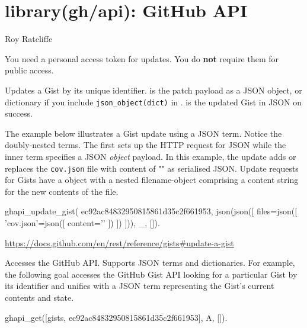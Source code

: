 \chapter{library(gh/api): GitHub API}\label{sec:api}

\begin{tags}
Roy Ratcliffe
\end{tags}

You need a personal access token for updates. You do \textbf{not} require
them for public access.\vspace{0.7cm}

\begin{description}
Updates a Gist by its unique identifier.  is the patch payload
as a JSON object, or dictionary if you include \verb$json_object(dict)$ in
.  is the updated Gist in JSON on success.

The example below illustrates a Gist update using a JSON term.
Notice the doubly-nested  terms. The first sets up the HTTP
request for JSON while the inner term specifies a JSON \textit{object}
payload. In this example, the update adds or replaces the \verb$cov.json$
file with content of "\Scurl{}" as serialised JSON. Update requests for
Gists have a  object with a nested filename-object comprising
a content string for the new contents of the file.

\begin{code}
ghapi_update_gist(
    ec92ac84832950815861d35c2f661953,
    json(json([ files=json([ 'cov.json'=json([ content='{}'
                                             ])
                           ])
              ])), _, []).
\end{code}

\begin{tags}
\url{https://docs.github.com/en/rest/reference/gists\#update-a-gist}
\end{tags}

Accesses the GitHub API. Supports JSON terms and dictionaries. For
example, the following goal accesses the GitHub Gist API looking for
a particular Gist by its identifier and unifies  with a JSON term
representing the Gist's current contents and state.

\begin{code}
ghapi_get([gists, ec92ac84832950815861d35c2f661953], A, []).
\end{code}


\end{description}
